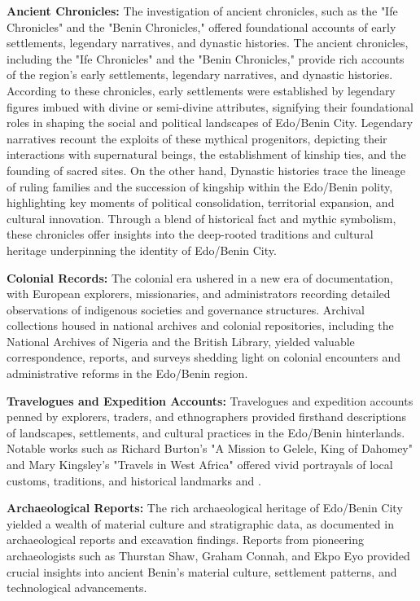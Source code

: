 \vspace{0.5cm} 
\textbf{Ancient Chronicles:} The investigation of ancient chronicles, such as the "Ife Chronicles" and the "Benin Chronicles," offered foundational accounts of early settlements, legendary narratives, and dynastic histories\cite{otterbein1966}. The ancient chronicles, including the "Ife Chronicles" and the "Benin Chronicles," provide rich accounts of the region's early settlements, legendary narratives, and dynastic histories. According to these chronicles, early settlements were established by legendary figures imbued with divine or semi-divine attributes, signifying their foundational roles in shaping the social and political landscapes of Edo/Benin City. Legendary narratives recount the exploits of these mythical progenitors, depicting their interactions with supernatural beings, the establishment of kinship ties, and the founding of sacred sites. On the other hand, Dynastic histories trace the lineage of ruling families and the succession of kingship within the Edo/Benin polity, highlighting key moments of political consolidation, territorial expansion, and cultural innovation. Through a blend of historical fact and mythic symbolism, these chronicles offer insights into the deep-rooted traditions and cultural heritage underpinning the identity of Edo/Benin City.

\textbf{Colonial Records:} The colonial era ushered in a new era of documentation, with European explorers, missionaries, and administrators recording detailed observations of indigenous societies and governance structures. Archival collections housed in national archives and colonial repositories, including the National Archives of Nigeria and the British Library, yielded valuable correspondence, reports, and surveys shedding light on colonial encounters and administrative reforms in the Edo/Benin region\cite{oliver1985}.

\textbf{Travelogues and Expedition Accounts:} Travelogues and expedition accounts penned by explorers, traders, and ethnographers provided firsthand descriptions of landscapes, settlements, and cultural practices in the Edo/Benin hinterlands. Notable works such as Richard Burton's "A Mission to Gelele, King of Dahomey" and Mary Kingsley's "Travels in West Africa" offered vivid portrayals of local customs, traditions, and historical landmarks\cite{burton2011} and \cite{kingsley1988}.

\textbf{Archaeological Reports:} The rich archaeological heritage of Edo/Benin City yielded a wealth of material culture and stratigraphic data, as documented in archaeological reports and excavation findings. Reports from pioneering archaeologists such as Thurstan Shaw, Graham Connah, and Ekpo Eyo provided crucial insights into ancient Benin's material culture, settlement patterns, and technological advancements\cite{shaw1970,connah1975}.

